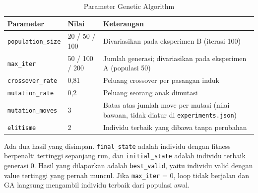 \documentclass[12pt,a4paper]{report}
\newcommand{\hd}[1]{\cellcolor{hdr}\textbf{#1}}
\newcommand{\code}[1]{\texttt{\small #1}}
\begin{document}
\begin{table}[H]
\centering
\caption{Parameter Genetic Algorithm}\label{tab:paramga}
\small
\begin{tabular}{|L{4.2cm}|C{2.6cm}|L{6.4cm}|}
\hline
\hd{Parameter} & \hd{Nilai} & \hd{Keterangan} \\ \hline
\code{population\_size} & 20 / 50 / 100 & Divariasikan pada eksperimen B (iterasi 100) \\ \hline
\code{max\_iter} & 50 / 100 / 200 & Jumlah generasi; divariasikan pada eksperimen A (populasi 50) \\ \hline
\code{crossover\_rate} & 0,81 & Peluang crossover per pasangan induk \\ \hline
\code{mutation\_rate} & 0,2 & Peluang seorang anak dimutasi \\ \hline
\code{mutation\_moves} & 3 & Batas atas jumlah move per mutasi (nilai bawaan, tidak diatur di \code{experiments.json}) \\ \hline
\code{elitisme} & 2 & Individu terbaik yang dibawa tanpa perubahan \\ \hline
\end{tabular}
\end{table}

Ada dua hasil yang disimpan. \code{final\_state} adalah individu dengan fitness berpenalti
tertinggi sepanjang run, dan \code{initial\_state} adalah individu terbaik generasi 0. Hasil yang
dilaporkan adalah \code{best\_valid}, yaitu individu valid dengan value tertinggi yang pernah muncul.
Jika \code{max\_iter} = 0, loop tidak berjalan dan GA langsung mengambil individu terbaik dari
populasi awal.
\end{document}
